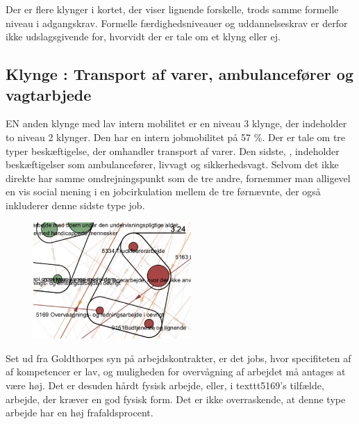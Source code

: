 Der er flere klynger i kortet, der viser lignende forskelle, trods samme formelle niveau i adgangskrav. Formelle færdighedsniveauer og uddannelseskrav er derfor ikke udslagsgivende for, hvorvidt der er tale om et klyng eller ej. %


\subsection{Klynge : Transport af varer, ambulancefører og vagtarbjede}

EN anden klynge  med lav intern mobilitet er en niveau 3 klynge, der indeholder to niveau 2 klynger. Den har en intern jobmobilitet på 57 \%. Der er tale om tre typer beskæftigelse, der omhandler transport af varer. Den sidste, , indeholder beskæftigelser som ambulancefører, livvagt og sikkerhedsvagt. Selvom det ikke direkte har samme omdrejningspunkt som de tre andre, fornemmer man alligevel en vis social mening i en jobcirkulation mellem de tre førnævnte, der også inkluderer denne sidste type job. 

%
\begin{figure}
  \vspace{-20pt}
  \begin{center}
    \includegraphics[width=6cm]{fig/segzoom/seg_3_24.pdf}
   \caption{}
   \label{fig_delanalyse1_zoom_3_24}
  \end{center}
  \vspace{-20pt}
\end{figure}
%

Set ud fra Goldthorpes syn på arbejdskontrakter, er det jobs, hvor specifiteten af af kompetencer er lav, og muligheden for overvågning af arbejdet må antages at være høj. Det er desuden hårdt fysisk arbejde, eller, i  texttt{5169}'s tilfælde, arbejde, der kræver en god fysisk form. Det er ikke overraskende, at denne type arbejde har en høj frafaldsprocent. %

